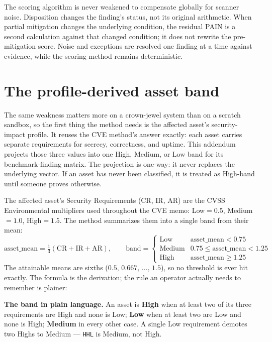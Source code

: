 \documentclass[11pt]{article}
\newcommand{\code}[1]{\texttt{#1}}
\begin{document}
The scoring algorithm is never weakened to compensate globally for scanner noise.
Disposition changes the finding's status, not its original arithmetic. When partial
mitigation changes the underlying condition, the residual PAIN is a second
calculation against that changed condition; it does not rewrite the pre-mitigation
score. Noise and exceptions are resolved one finding at a time against evidence,
while the scoring method remains deterministic.

\section{The profile-derived asset band}
\label{sec:band}
\begin{plain}
The same weakness matters more on a crown-jewel system than on a scratch sandbox, so
the first thing the method needs is the affected asset's security-impact profile.
It reuses the CVE method's answer exactly: each asset carries separate requirements
for secrecy, correctness, and uptime. This addendum projects those three values into
one High, Medium, or Low band for its benchmark-finding matrix. The projection is
one-way: it never replaces the underlying vector. If an asset has never been
classified, it is treated as High-band until someone proves otherwise.
\end{plain}

The affected asset's Security Requirements (CR, IR, AR) are the CVSS Environmental
multipliers used throughout the CVE memo: Low${}=0.5$, Medium${}=1.0$,
High${}=1.5$. The method summarizes them into a single band from their mean:
\[
\text{asset\_mean} = \tfrac{1}{3}(\mathrm{CR}+\mathrm{IR}+\mathrm{AR}),\qquad
\text{band} =
\begin{cases}
\text{Low} & \text{asset\_mean} < 0.75\\
\text{Medium} & 0.75 \le \text{asset\_mean} < 1.25\\
\text{High} & \text{asset\_mean} \ge 1.25
\end{cases}
\]
The attainable means are sixths ($0.5,\,0.667,\,\dots,\,1.5$), so no threshold is
ever hit exactly. The formula is the derivation; the rule an operator actually needs
to remember is plainer:

\begin{definitionbox}
\textbf{The band in plain language.} An asset is \textbf{High} when at least two of
its three requirements are High and none is Low; \textbf{Low} when at least two are
Low and none is High; \textbf{Medium} in every other case. A single Low requirement
demotes two Highs to Medium --- \code{HHL} is Medium, not High.
\end{definitionbox}
\end{document}
